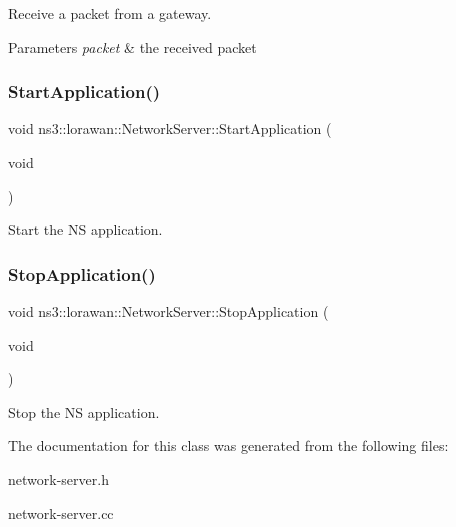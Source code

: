 Receive a packet from a gateway. 
\begin{DoxyParams}{Parameters}
{\em packet} & the received packet \\
\hline
\end{DoxyParams}
\mbox{\label{classns3_1_1lorawan_1_1NetworkServer_a49f56a2a0906c49cce6530cd4a734b1e}} 
\subsubsection{\texorpdfstring{Start\+Application()}{StartApplication()}}
{\footnotesize\ttfamily void ns3\+::lorawan\+::\+Network\+Server\+::\+Start\+Application (\begin{DoxyParamCaption}\item[{void}]{ }\end{DoxyParamCaption})}

Start the NS application. \mbox{\label{classns3_1_1lorawan_1_1NetworkServer_ad6a5b6bae3c4d290e1e7001841a1fe42}} 
\subsubsection{\texorpdfstring{Stop\+Application()}{StopApplication()}}
{\footnotesize\ttfamily void ns3\+::lorawan\+::\+Network\+Server\+::\+Stop\+Application (\begin{DoxyParamCaption}\item[{void}]{ }\end{DoxyParamCaption})}

Stop the NS application. 

The documentation for this class was generated from the following files\+:\begin{DoxyCompactItemize}
\item 
network-\/server.\+h\item 
network-\/server.\+cc\end{DoxyCompactItemize}
